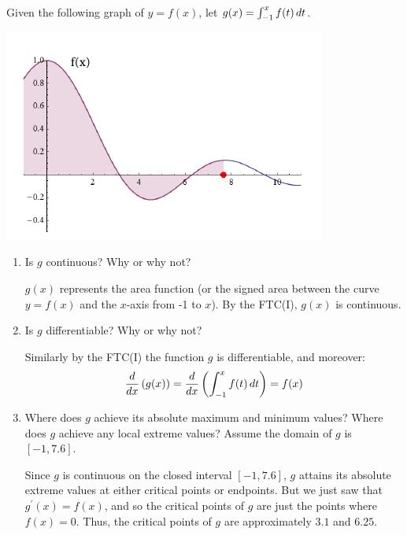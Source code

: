 \documentclass[nooutcomes,handout]{ximera}
\begin{document}
\begin{problem}
  Given the following graph of $y=f(x)$, let $g(x) = \int_{-1}^x f(t) \,d t$.
  
      \begin{image}
      \includegraphics{Figure2.png}
    \end{image}
  
  \begin{enumerate}

  \item  Is $g$ continuous?  Why or why not?
     \begin{freeResponse}
     $g(x)$ represents the area function (or the signed area between the curve $y=f(x)$ and the $x$-axis from -1 to $x$).  By the FTC(I), $g(x)$ is continuous.
    \end{freeResponse}
    
    
    
  \item  Is $g$ differentiable?  Why or why not?
     \begin{freeResponse}
    Similarly by the FTC(I) the function $g$ is differentiable, and moreover:
        $$\frac{d}{dx} \left( g(x) \right) = \frac{d}{dx} \left( \int_{-1}^x f(t) \,d t \right)= f(x)$$
     \end{freeResponse}
    
    
    
  \item  Where does $g$ achieve its absolute maximum and minimum values?  Where does $g$ achieve any local extreme values?  Assume the domain of $g$ is $[-1,7.6]$.
    \begin{freeResponse}
    Since $g$ is continuous on the closed interval $[-1,7.6]$, $g$ attains its absolute extreme values at either critical points or endpoints.  
        But we just saw that $g^\prime(x) = f(x)$, and so the critical points of $g$ are just the points where $f(x) = 0$.  
        Thus, the critical points of $g$ are approximately $3.1$ and $6.25$.
        

\end{freeResponse}
\end{enumerate}
\end{problem}
\end{document}
